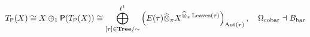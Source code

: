 \documentclass[preview]{standalone}
\begin{document}
\begin{align*}
\special{dvisvgm:raw <g id='unique000'>}T_{\mathsf{P}}(X) \cong X \oplus_1 \mathsf{P}(T_{\mathsf{P}}(X)) \cong \bigoplus_{[\tau]\in\mathbf{Tree}/\sim}^{\ell^1} \left(E(\tau)\widehat{\otimes}_\pi X^{\widehat{\otimes}_\pi\operatorname{Leaves}(\tau)}\right)_{\operatorname{Aut}(\tau)}, \quad \Omega_{\text{cobar}} \dashv B_{\text{bar}}\special{dvisvgm:raw </g>}
\end{align*}
\end{document}
